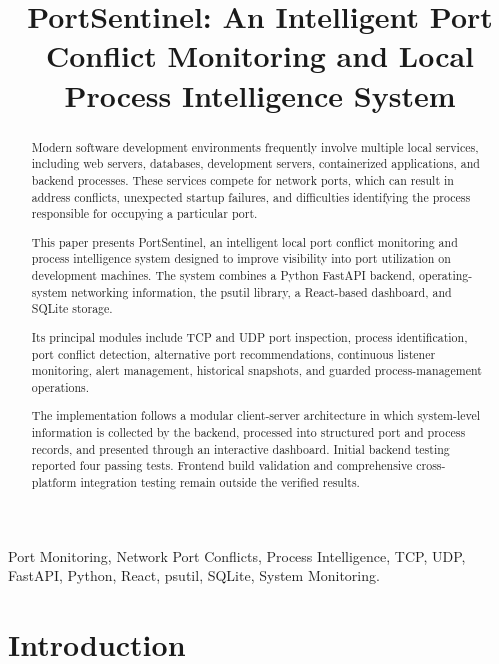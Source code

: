 \documentclass[conference]{IEEEtran}
\title{PortSentinel: An Intelligent Port Conflict Monitoring and Local Process Intelligence System}
\author{
\IEEEauthorblockN{Chethana Sri}
\IEEEauthorblockA{
Department of Computer Technology\\
Madras Institute of Technology, Anna University\\
Chennai, India
}
}
\begin{document}
\maketitle

\begin{abstract}

Modern software development environments frequently involve
multiple local services, including web servers, databases,
development servers, containerized applications, and backend
processes. These services compete for network ports, which
can result in address conflicts, unexpected startup failures,
and difficulties identifying the process responsible for
occupying a particular port.

This paper presents PortSentinel, an intelligent local port
conflict monitoring and process intelligence system designed
to improve visibility into port utilization on development
machines. The system combines a Python FastAPI backend,
operating-system networking information, the psutil library,
a React-based dashboard, and SQLite storage.

Its principal modules include TCP and UDP port inspection,
process identification, port conflict detection, alternative
port recommendations, continuous listener monitoring,
alert management, historical snapshots, and guarded
process-management operations.

The implementation follows a modular client-server
architecture in which system-level information is collected
by the backend, processed into structured port and process
records, and presented through an interactive dashboard.
Initial backend testing reported four passing tests.
Frontend build validation and comprehensive cross-platform
integration testing remain outside the verified results.

\end{abstract}

\begin{IEEEkeywords}
Port Monitoring, Network Port Conflicts, Process Intelligence,
TCP, UDP, FastAPI, Python, React, psutil, SQLite,
System Monitoring.
\end{IEEEkeywords}

\section{Introduction}
\end{document}
